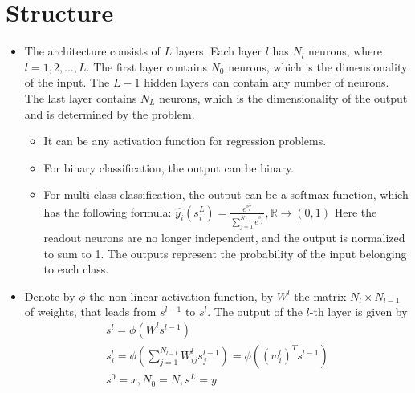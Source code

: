 \documentclass[11pt]{book} %
\begin{document}
\section{Structure}
\begin{itemize}
    \item The architecture consists of $L$ layers.
        Each layer $l$ has $N_l$ neurons, where $l = 1, 2, \ldots, L$.
        The first layer contains $N_0$ neurons, which is the dimensionality of the input.
        The $L-1$ hidden layers can contain any number of neurons.
        The last layer contains $N_L$ neurons, which is the dimensionality of the output and is determined by the problem.
        \begin{itemize}
            \item It can be any activation function for regression problems.
            \item For binary classification, the output can be binary.
            \item For multi-class classification, the output can be a softmax function, which has the following formula:
            $\hat{y_i} (s_i^L) = \frac{e^{s_i^L}}{\sum_{j=1}^{N_L} e^{s_j^L}} , \mathbb{R} \rightarrow (0, 1)$
            Here the readout neurons are no longer independent, and the output is normalized to sum to 1. 
            The outputs represent the probability of the input belonging to each class.
        \end{itemize}
    \item Denote by $\phi$ the non-linear activation function, by $W^l$ the matrix $N_l \times N_{l-1}$ of weights, that leads from $s^{l-1}$ to $s^l$. 
        The output of the $l$-th layer is given by 
        \begin{align*}
            s^l = \phi(W^l s^{l-1}) \\
            s_i^l = \phi(\sum_{j=1}^{N_{l-1}} W_{ij}^l s_j^{l-1}) = \phi((w_i^l)^T s^{l-1}) \\ 
            s^0 = x , N_0 = N, s^L = y
        \end{align*}
\end{itemize}

\end{document}
